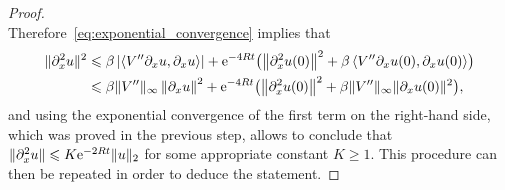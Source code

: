 \documentclass[11pt,a4paper]{article}
\newcommand{\e}{\mathrm{e}}
\theoremstyle{plain}
\newtheorem{remark}{Remark}[section]
\numberwithin{equation}{section}
\renewcommand{\leq}{\leqslant}
\renewcommand{\geq}{\geqslant}
\begin{document}
\begin{proof}
\[    \]
    Therefore~\eqref{eq:exponential_convergence} implies that
    \begin{align*}
        \norm*{\partial_x^2 u}^2
        &\leq \beta \abs{\ip{V'' \partial_x u}{\partial_x u}} + \e^{-4Rt} \bigl( \norm{\partial_x^2 u(0)}^2 + \beta \ip{V'' \partial_x u(0)}{\partial_x u(0)} \bigr) \\
        &\leq \beta \norm*{V''}_{\infty} \norm{\partial_x u}^2 + \e^{-4Rt} \bigl( \norm{\partial_x^2 u(0)}^2 + \beta \norm*{V''}_{\infty} \norm*{\partial_x u(0)}^2 \bigr),
    \end{align*}
    and using the exponential convergence of the first term on the right-hand side,
    which was proved in the previous step,
    allows to conclude that $\norm*{\partial_x^2 u} \leq K \e^{-2 Rt} \norm*{u}[2]$ for some appropriate constant $K \geq 1$.
    This procedure can then be repeated in order to deduce the statement.
\end{proof}

\end{document}
